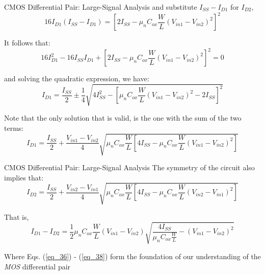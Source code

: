 \documentclass[10pt]{beamer}
\begin{document}
\begin{frame}{CMOS Differential Pair: Large-Signal Analysis}
    and substitute $I_{SS} - I_{D1}$ for $I_{D2}$,
    \begin{equation}
        16I_{D1}(I_{SS} - I_{D1}) = \left[ 2I_{SS} - \mu_{n} C_{ox} \frac{W}{L} (V_{in1} - V_{in2})^{2} \right]^{2}
        \label{eq_33}
    \end{equation}
    
    It follows that:
    \begin{equation}
        16I_{D1}^{2} - 16I_{SS}I_{D1} + \left[ 2I_{SS} - \mu_{n} C_{ox} \frac{W}{L} (V_{in1} - V_{in2})^{2} \right]^{2} = 0
        \label{eq_34}
    \end{equation}
    
    and solving the quadratic expression, we have:
    \begin{equation}
        I_{D1} = \frac{I_{SS}}{2} \pm \frac{1}{4} \sqrt{4I_{SS}^{2} - \left[\mu_{n} C_{ox} \frac{W}{L}(V_{in1} - V_{in2})^{2} -2I_{SS}\right]^2}
        \label{eq_35}
    \end{equation}
    
    Note that the only solution that is valid, is the one with the sum of the two terms:
    \begin{equation}
        I_{D1} = \frac{I_{SS}}{2} + \frac{V_{in1} - V_{in2}}{4} \sqrt{\mu_{n} C_{ox} \frac{W}{L} \left[4I_{SS} - \mu_{n} C_{ox} \frac{W}{L} (V_{in1} - V_{in2})^{2}\right]}
        \label{eq_36}
    \end{equation}
\end{frame}



\begin{frame}{CMOS Differential Pair: Large-Signal Analysis}
    The symmetry of the circuit also implies that:
    \begin{equation}
        I_{D2} = \frac{I_{SS}}{2} + \frac{V_{in2} - V_{in1}}{4} \sqrt{\mu_{n} C_{ox} \frac{W}{L} \left[4I_{SS} - \mu_{n} C_{ox} \frac{W}{L} (V_{in2} - V_{in1})^{2}\right]}
        \label{eq_37}
    \end{equation}
    
    That is,
    \begin{equation}
        I_{D1} - I_{D2} = \frac{1}{2} \mu_{n} C_{ox} \frac{W}{L} (V_{in1} - V_{in2}) \sqrt{\frac{4I_{SS}}{\mu_{n} C_{ox} \frac{W}{L}} - (V_{in1} - V_{in2})^2}
        \label{eq_38}
    \end{equation}
    
    Where Eqs. (\ref{eq_36}) - (\ref{eq_38}) form the foundation of our understanding of the \textit{MOS} differential pair
\end{frame}
\end{document}
